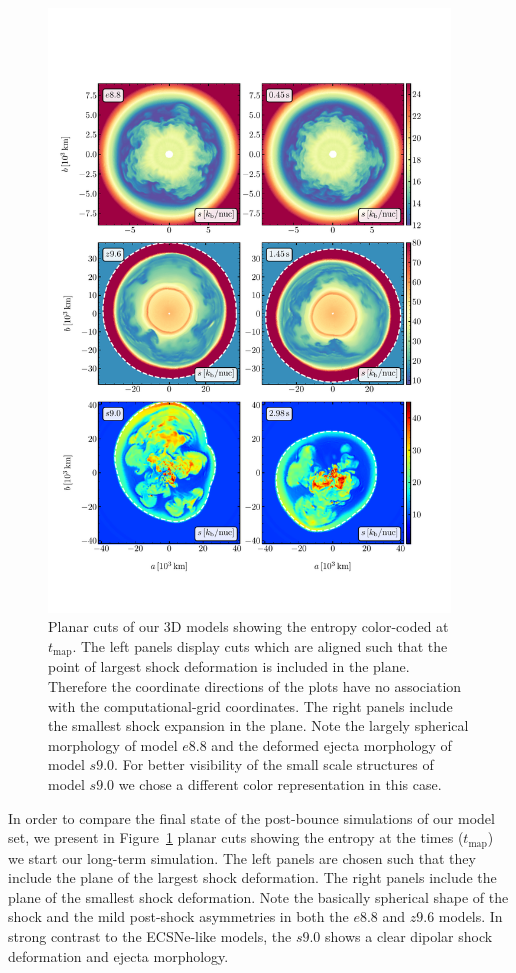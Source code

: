 \documentclass[fleqn,usenatbib]{mnras}
\newcommand{\GEO}[1]{{\color{red}#1}}
\begin{document}
\begin{figure}
 \centering
 \includegraphics[width=0.95\textwidth,trim=0cm 1.8cm 0cm 3cm,clip]{pic/all_3d_sto_slices_time_0.pdf}
 \caption{Planar cuts of our 3D models showing the entropy color-coded at $t_{\mathrm{map}}$. The left panels display cuts which are aligned such that the point of largest shock deformation is included in the plane. Therefore the coordinate directions of the plots have no association with the computational-grid coordinates. The right panels include the smallest shock expansion in the plane. Note the largely spherical morphology of model $e8.8$ and the deformed ejecta morphology of model $s9.0$. For better visibility of the small scale structures of model $s9.0$ we chose a different color representation in this case.}
 \label{fig:slices first mapping}
\end{figure}
In order to compare the final state of the post-bounce simulations of our model set, we \GEO{present} in Figure~\ref{fig:slices first mapping} planar cuts showing the entropy at the times ($t_{\mathrm{map}}$) we start our long-term simulation. The left panels are chosen such that they include the plane of the largest shock deformation. The right panels include the plane of the smallest shock deformation.
Note the \GEO{basically spherical shape of the shock and the mild post-shock asymmetries} in both the $e8.8$ and $z9.6$ models.
In strong contrast to the ECSNe-like models, the $s9.0$ shows a clear dipolar shock deformation and ejecta morphology. 
\end{document}
